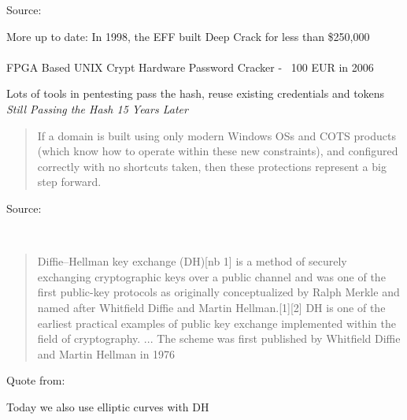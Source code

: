\documentclass[Screen16to9,17pt]{foils}
\begin{document}


Source: 

{\small
More up to date:  In 1998, the EFF built Deep Crack for less than \$250,000\\
\\
FPGA Based UNIX Crypt Hardware Password Cracker - ~100 EUR in 2006\\
}


Lots of tools in pentesting pass the hash, reuse existing credentials and tokens
\emph{Still Passing the Hash 15 Years Later}\\

\begin{quote}
If a domain is built using only modern Windows OSs and COTS products (which know how to operate within these new constraints), and configured correctly with no shortcuts taken, then these protections represent a big step forward.
\end{quote}

Source:\\
{\small{}
}




{~}

\begin{quote}
Diffie–Hellman key exchange (DH)[nb 1] is a method of securely exchanging cryptographic keys over a public channel and was one of the first public-key protocols as originally conceptualized by Ralph Merkle and named after Whitfield Diffie and Martin Hellman.[1][2] DH is one of the earliest practical examples of public key exchange implemented within the field of cryptography.
... The scheme was first published by Whitfield Diffie and Martin Hellman in 1976
\end{quote}

\begin{list2}
\item Quote from: {\small {}}
\item Today we also use elliptic curves with DH \\{\small {}}
\end{list2}
\end{document}
